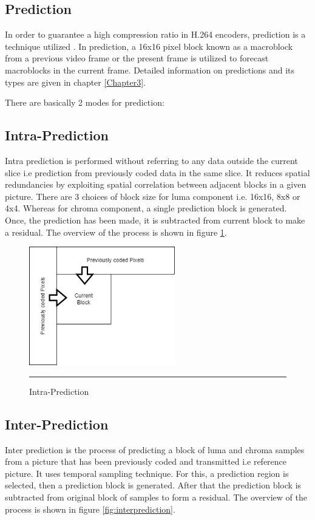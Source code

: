 \subsection{Prediction}
In order to guarantee a high compression ratio in H.264 encoders, prediction is a technique utilized \cite{richardson2010h264}. In prediction, a 16x16 pixel block known as a macroblock from a previous video frame or the present frame is utilized to forecast macroblocks in the current frame. Detailed information on predictions and its types are given in chapter \ref{Chapter3}.

There are basically 2 modes for prediction:

\subsection{Intra-Prediction}
Intra prediction is performed without referring to any data outside the current slice i.e prediction from previously coded data in the same slice. It reduces spatial redundancies by exploiting spatial correlation between adjacent blocks in a given picture. There are 3 choices of block size for luma component i.e. 16x16, 8x8 or 4x4. Whereas for chroma component, a single prediction block is generated. Once, the prediction has been made, it is subtracted from current block to make a residual. The overview of the process is shown in figure \ref{fig:intraprediction}.

\begin{figure}[htbp]
	\centering
	\includegraphics[width = 2.5in]{./Figures/comp1.png}
	\rule{35em}{0.5pt}
	\caption{Intra-Prediction}
	\label{fig:intraprediction}
\end{figure}

\subsection{Inter-Prediction}
Inter prediction is the process of predicting a block of luma and chroma samples from a picture that has been previously coded and transmitted i.e reference picture. It uses temporal sampling technique. For this, a prediction region is selected, then a prediction block is generated. After that the prediction block is subtracted from original block of samples to form a residual. The overview of the process is shown in figure \ref{fig:interprediction}.

